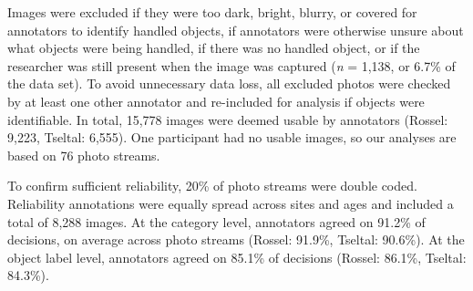\documentclass[10pt, letterpaper]{article}
\begin{document}
Images were excluded if they were too dark, bright, blurry, or covered
for annotators to identify handled objects, if annotators were otherwise
unsure about what objects were being handled, if there was no handled
object, or if the researcher was still present when the image was
captured (\emph{n} = 1,138, or 6.7\% of the data set). To avoid
unnecessary data loss, all excluded photos were checked by at least one
other annotator and re-included for analysis if objects were
identifiable. In total, 15,778 images were deemed usable by annotators
(Rossel: 9,223, Tseltal: 6,555). One participant had no usable images,
so our analyses are based on 76 photo streams.

To confirm sufficient reliability, 20\% of photo streams were double
coded. Reliability annotations were equally spread across sites and ages
and included a total of 8,288 images. At the category level, annotators
agreed on 91.2\% of decisions, on average across photo streams (Rossel:
91.9\%, Tseltal: 90.6\%). At the object label level, annotators agreed
on 85.1\% of decisions (Rossel: 86.1\%, Tseltal: 84.3\%).

\begin{table}[!ht]

\caption{\label{tab:top-objects}Number of unique objects (N) and objects handled by the most children, for each category, across sites.}
\centering
{}
\end{table}
\end{document}
